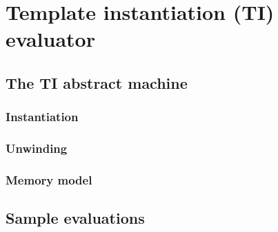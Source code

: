 \section{Template instantiation (TI) evaluator}
\label{sec:ti}


\subsection{The TI abstract machine}
\label{sec:ti-machine}


\subsubsection{Instantiation}
\label{sec:ti-instantiation}


\subsubsection{Unwinding}
\label{sec:ti-unwind}

\subsubsection{Memory model}
\label{sec:ti-memory}

\subsection{Sample evaluations}
\label{sec:ti-examples}





